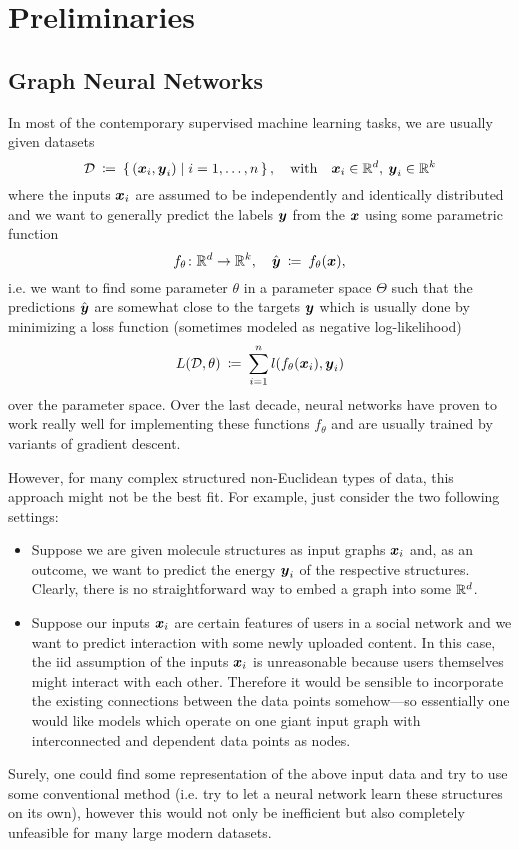 \section{Preliminaries}

\subsection{Graph Neural Networks}

In most of the contemporary supervised machine learning tasks, we are usually given 
datasets
\[ 
    \mathcal{D} \: \coloneqq \: 
    \left\{\, (\boldsymbol{x}_i, \boldsymbol{y}_i) \; \middle| \; i=1, \dots, n \,\right\}, 
    \quad \text{with} \quad \boldsymbol{x}_i \in \mathbb{R}^{d}, \: \boldsymbol{y}_i \in \mathbb{R}^k 
\]
where the inputs $\boldsymbol{x}_i$ are assumed to be independently and identically 
distributed and we want to generally predict the labels $\boldsymbol{y}$ from the $\boldsymbol{x}$ using
some parametric function
\[
    f_\theta \colon \mathbb{R}^d \to \mathbb{R}^k, \quad
    \hat{\boldsymbol{y}} \: \coloneqq \: f_\theta(\boldsymbol{x}),
\]
i.e. we want to find some parameter $\theta$ in a parameter space $\Theta$ such that
the predictions $\hat{\boldsymbol{y}}$ are somewhat close to the targets $\boldsymbol{y}$ which is usually
done by minimizing a loss function (sometimes modeled as negative log-likelihood)
\[
    L(\mathcal{D}, \theta) \: \coloneqq \: \sum_{i=1}^n l(f_\theta(\boldsymbol{x}_i), \boldsymbol{y}_i)
\]
over the parameter space. Over the last decade, neural networks have proven to work 
really well for implementing these functions $f_\theta$ and are usually trained by 
variants of gradient descent.

However, for many complex structured non-Euclidean types of data, this approach might 
not be the best fit. For example, just consider the two following settings:
\begin{itemize}
    \item Suppose we are given molecule structures as input graphs $\boldsymbol{x}_i$ and, as an 
          outcome, we want to predict the energy $\boldsymbol{y}_i$ of the respective structures. 
          Clearly, there is no straightforward way to embed a graph into some $\mathbb{R}^d$.
    \item Suppose our inputs $\boldsymbol{x}_i$ are certain features of users in a social network
          and we want to predict interaction with some newly uploaded content. In this 
          case, the iid assumption of the inputs $\boldsymbol{x}_i$ is unreasonable because users
          themselves might interact with each other. Therefore it would be sensible to
          incorporate the existing connections between the data points somehow---so 
          essentially one would like models which operate on one giant input graph with 
          interconnected and dependent data points as nodes.
\end{itemize}
Surely, one could find some representation of the above input data and try to use some
conventional method (i.e. try to let a neural network learn these structures on its own),
however this would not only be inefficient but also completely unfeasible for many large 
modern datasets. 

